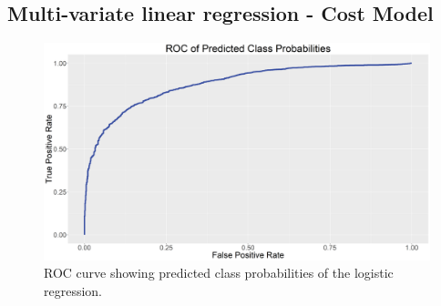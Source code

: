 \documentclass{llncs}
\begin{document}
\subsection{Multi-variate linear regression - Cost Model}

\FloatBarrier
\begin{figure}
\includegraphics[width=\textwidth, height=\textheight, keepaspectratio]{000LogisticModelROC.png}
\caption{ROC curve showing predicted class probabilities of the logistic regression.}
\label{figure:LogisticROC}

\end{figure}
\FloatBarrier
\end{document}
